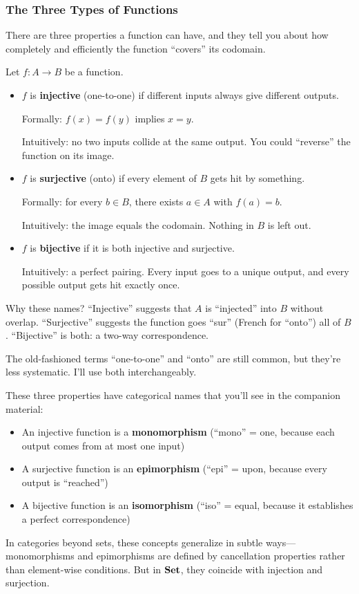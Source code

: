 \subsubsection*{The Three Types of Functions}

There are three properties a function can have, and they tell you about how completely and efficiently the function ``covers'' its codomain.

\begin{definition}
Let $f: A \to B$ be a function.
\begin{itemize}
  \item $f$ is \textbf{injective} (one-to-one) if different inputs always give different outputs.

  Formally: $f(x) = f(y)$ implies $x = y$.

  Intuitively: no two inputs collide at the same output. You could ``reverse'' the function on its image.

  \item $f$ is \textbf{surjective} (onto) if every element of $B$ gets hit by something.

  Formally: for every $b \in B$, there exists $a \in A$ with $f(a) = b$.

  Intuitively: the image equals the codomain. Nothing in $B$ is left out.

  \item $f$ is \textbf{bijective} if it is both injective and surjective.

  Intuitively: a perfect pairing. Every input goes to a unique output, and every possible output gets hit exactly once.
\end{itemize}
\end{definition}

Why these names? ``Injective'' suggests that $A$ is ``injected'' into $B$ without overlap. ``Surjective'' suggests the function goes ``sur'' (French for ``onto'') all of $B$. ``Bijective'' is both: a two-way correspondence.

The old-fashioned terms ``one-to-one'' and ``onto'' are still common, but they're less systematic. I'll use both interchangeably.

\begin{keyresult}
These three properties have categorical names that you'll see in the companion material:
\begin{itemize}
  \item An injective function is a \textbf{monomorphism} (``mono'' = one, because each output comes from at most one input)
  \item A surjective function is an \textbf{epimorphism} (``epi'' = upon, because every output is ``reached'')
  \item A bijective function is an \textbf{isomorphism} (``iso'' = equal, because it establishes a perfect correspondence)
\end{itemize}
In categories beyond sets, these concepts generalize in subtle ways---monomorphisms and epimorphisms are defined by cancellation properties rather than element-wise conditions. But in $\mathbf{Set}$, they coincide with injection and surjection.
\end{keyresult}

